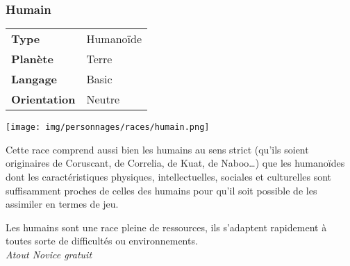 \subsubsection{Humain}
\begin{samepage}
	\begin{flushright}
		\begin{tabular}{ l l }
			\textbf{Type} 			& Humanoïde \\
		   	\textbf{Planète} 		& Terre \\
		   	\textbf{Langage} 		& Basic \\
		   	\textbf{Orientation} 	& Neutre \\
		\end{tabular}
	\end{flushright}

	\vspace{-6\baselineskip}
	\texttt{[image: img/personnages/races/humain.png]} 
\end{samepage}

Cette race comprend aussi bien les humains au sens strict (qu’ils soient originaires de Coruscant, de Correlia, de Kuat, de Naboo\ldots) que les humanoïdes dont les caractéristiques physiques, intellectuelles, sociales et culturelles sont suffisamment proches de celles des humains pour qu’il soit possible de les assimiler en termes de jeu.

\begin{description}[align=left]
\item [Adaptabilité] 	%
	Les humains sont une race pleine de ressources, ils s’adaptent rapidement à toutes sorte de difficultés ou environnements.\\
	\textit{Atout Novice gratuit}
\end{description}